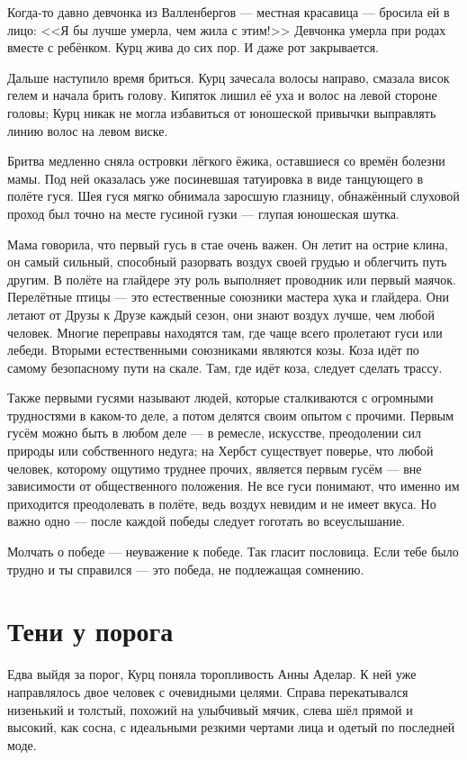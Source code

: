 Когда-то давно девчонка из Валленбергов --- местная красавица --- бросила ей в лицо:
<<Я бы лучше умерла, чем жила с этим!>>
Девчонка умерла при родах вместе с ребёнком.
Курц жива до сих пор.
И даже рот закрывается.

Дальше наступило время бриться.
Курц зачесала волосы направо, смазала висок гелем и начала брить голову.
Кипяток лишил её уха и волос на левой стороне головы;
Курц никак не могла избавиться от юношеской привычки выправлять линию волос на левом виске.

Бритва медленно сняла островки лёгкого ёжика, оставшиеся со времён болезни мамы.
Под ней оказалась уже посиневшая татуировка в виде танцующего в полёте гуся.
Шея гуся мягко обнимала заросшую глазницу, обнажённый слуховой проход был точно на месте гусиной гузки --- глупая юношеская шутка.

Мама говорила, что первый гусь в стае очень важен.
Он летит на острие клина, он самый сильный, способный разорвать воздух своей грудью и облегчить путь другим.
В полёте на глайдере эту роль выполняет проводник или первый маячок.
Перелётные птицы --- это естественные союзники мастера хука и глайдера.
Они летают от Друзы к Друзе каждый сезон, они знают воздух лучше, чем любой человек.
Многие переправы находятся там, где чаще всего пролетают гуси или лебеди.
Вторыми естественными союзниками являются козы.
Коза идёт по самому безопасному пути на скале.
Там, где идёт коза, следует сделать трассу.

Также первыми гусями называют людей, которые сталкиваются с огромными трудностями в каком-то деле, а потом делятся своим опытом с прочими.
Первым гусём можно быть в любом деле --- в ремесле, искусстве, преодолении сил природы или собственного недуга;
на Хербст существует поверье, что любой человек, которому ощутимо труднее прочих, является первым гусём --- вне зависимости от общественного положения.
Не все гуси понимают, что именно им приходится преодолевать в полёте, ведь воздух невидим и не имеет вкуса.
Но важно одно --- после каждой победы следует гоготать во всеуслышание.

Молчать о победе --- неуважение к победе.
Так гласит пословица.
Если тебе было трудно и ты справился --- это победа, не подлежащая сомнению.

\section{Тени у порога}

Едва выйдя за порог, Курц поняла торопливость Анны Аделар.
К ней уже направлялось двое человек с очевидными целями.
Справа перекатывался низенький и толстый, похожий на улыбчивый мячик, слева шёл прямой и высокий, как сосна, с идеальными резкими чертами лица и одетый по последней моде.

